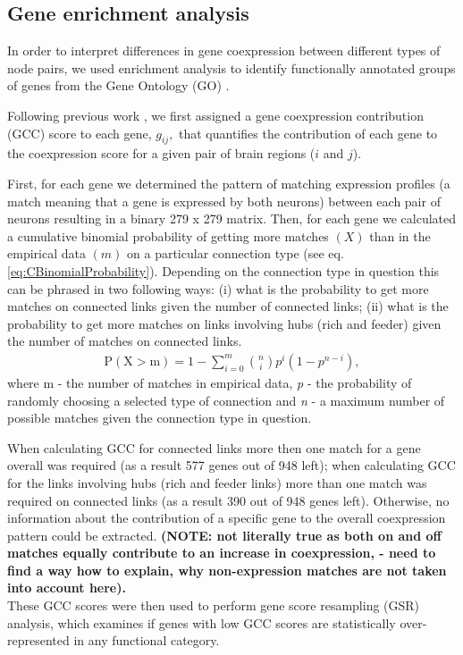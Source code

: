 \documentclass[10pt,letterpaper]{article}
\begin{document}
\subsection*{Gene enrichment analysis}
In order to interpret differences in gene coexpression between different types of node pairs, we used enrichment analysis to identify functionally annotated groups of genes from the Gene Ontology (GO) \cite{Ashburner2000}.

Following previous work \cite{Fulcher:2016ck}, we first assigned a gene coexpression contribution (GCC) score to each gene, $g_{ij},$ that quantifies the contribution of each gene to the coexpression score for a given pair of brain regions ($i$ and $j$).

First, for each gene we determined the pattern of matching expression profiles (a match meaning that a gene is expressed by both neurons) between each pair of neurons resulting in a binary 279 x 279 matrix.
Then, for each gene we calculated a cumulative binomial probability of getting more matches $(X)$ than in the empirical data $(m)$ on a particular connection type (see eq. \ref{eq:CBinomialProbability}).
Depending on the connection type in question this can be phrased in two following ways: (i) what is the probability to get more matches on connected links given the number of connected links; (ii) what is the probability to get more matches on links involving hubs (rich and feeder) given the number of matches on connected links.
\begin{eqnarray}
	\label{eq:CBinomialProbability}
     \mathrm{P(X>m)} = 1 - \sum_{\textit{i}=0}^{m}\binom{n}{i} p^{\textit{i}}(1-p^{n-\textit{i}}),
\end{eqnarray}
where m - the number of matches in empirical data, \textit{p} - the probability of randomly choosing a selected type of connection and \textit{n} - a maximum number of possible matches given the connection type in question.


When calculating GCC for connected links more then one match for a gene overall was required (as a result 577 genes out of 948 left); when calculating GCC for the links involving hubs (rich and feeder links) more than one match was required on connected links (as a result 390 out of 948 genes left).
Otherwise, no information about the contribution of a specific gene to the overall coexpression pattern could be extracted.
\textbf{(NOTE: not literally true as both on and off matches equally contribute to an increase in coexpression, - need to find a way how to explain, why non-expression matches are not taken into account here).}\\
These GCC scores were then used to perform gene score resampling (GSR) analysis, which examines if genes with low GCC scores are statistically over-represented in any functional category.
\end{document}
